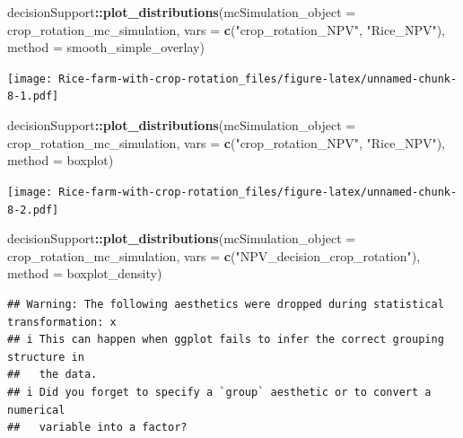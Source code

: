 \documentclass[
]{article}
\newenvironment{Shaded}{\begin{snugshade}}{\end{snugshade}}
\newcommand{\AttributeTok}[1]{\textcolor[rgb]{0.13,0.29,0.53}{#1}}
\newcommand{\FunctionTok}[1]{\textcolor[rgb]{0.13,0.29,0.53}{\textbf{#1}}}
\newcommand{\NormalTok}[1]{#1}
\newcommand{\SpecialCharTok}[1]{\textcolor[rgb]{0.81,0.36,0.00}{\textbf{#1}}}
\newcommand{\StringTok}[1]{\textcolor[rgb]{0.31,0.60,0.02}{#1}}
\begin{document}
\begin{Shaded}
\begin{Highlighting}[]
\NormalTok{decisionSupport}\SpecialCharTok{::}\FunctionTok{plot\_distributions}\NormalTok{(}\AttributeTok{mcSimulation\_object =}\NormalTok{ crop\_rotation\_mc\_simulation, }
                                    \AttributeTok{vars =} \FunctionTok{c}\NormalTok{(}\StringTok{"crop\_rotation\_NPV"}\NormalTok{, }\StringTok{"Rice\_NPV"}\NormalTok{),}
                                    \AttributeTok{method =} \StringTok{\textquotesingle{}smooth\_simple\_overlay\textquotesingle{}}\NormalTok{)}
\end{Highlighting}
\end{Shaded}

\texttt{[image: Rice-farm-with-crop-rotation\_files/figure-latex/unnamed-chunk-8-1.pdf]}

\begin{Shaded}
\begin{Highlighting}[]
\NormalTok{decisionSupport}\SpecialCharTok{::}\FunctionTok{plot\_distributions}\NormalTok{(}\AttributeTok{mcSimulation\_object =}\NormalTok{ crop\_rotation\_mc\_simulation, }
                                    \AttributeTok{vars =} \FunctionTok{c}\NormalTok{(}\StringTok{"crop\_rotation\_NPV"}\NormalTok{, }\StringTok{"Rice\_NPV"}\NormalTok{),}
                                    \AttributeTok{method =} \StringTok{\textquotesingle{}boxplot\textquotesingle{}}\NormalTok{)}
\end{Highlighting}
\end{Shaded}

\texttt{[image: Rice-farm-with-crop-rotation\_files/figure-latex/unnamed-chunk-8-2.pdf]}

\begin{Shaded}
\begin{Highlighting}[]
\NormalTok{decisionSupport}\SpecialCharTok{::}\FunctionTok{plot\_distributions}\NormalTok{(}\AttributeTok{mcSimulation\_object =}\NormalTok{ crop\_rotation\_mc\_simulation, }
                                    \AttributeTok{vars =} \FunctionTok{c}\NormalTok{(}\StringTok{"NPV\_decision\_crop\_rotation"}\NormalTok{),}
                                    \AttributeTok{method =} \StringTok{\textquotesingle{}boxplot\_density\textquotesingle{}}\NormalTok{)}
\end{Highlighting}
\end{Shaded}

\begin{verbatim}
## Warning: The following aesthetics were dropped during statistical transformation: x
## i This can happen when ggplot fails to infer the correct grouping structure in
##   the data.
## i Did you forget to specify a `group` aesthetic or to convert a numerical
##   variable into a factor?
\end{verbatim}
\end{document}
